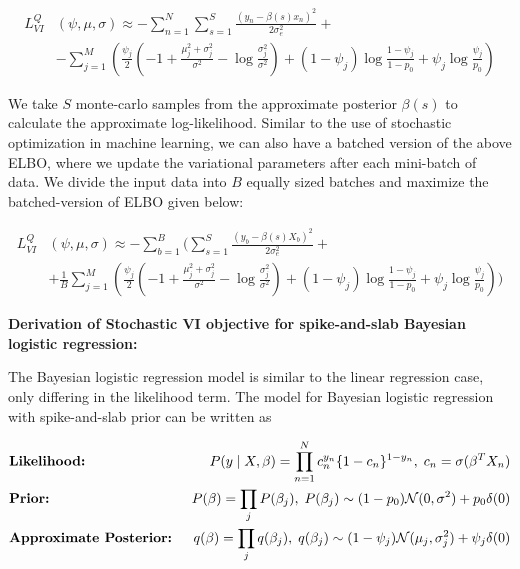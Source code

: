 \begin{align}
    L^{Q}_{VI}&(\psi, \mu, \sigma) \approx - \sum\limits^{N}_{n=1} \sum\limits^{S}_{s=1} \frac{(y_n - \beta(s) x_n)^2}{2 \sigma_e^2} + \nonumber \\
    &- \sum\limits^{M}_{j=1} \left(  \frac{\psi_j}{2}\left(-1 + \frac{\mu_j^2 + \sigma_j^2}{\sigma^2} - \log \frac{\sigma_j^2}{\sigma^2} \right) + (1-\psi_j)\log\frac{1 - \psi_j}{1 - p_0} + \psi_j\log\frac{\psi_j}{p_0} \right )
\end{align}

%
We take $S$ monte-carlo samples from the approximate posterior $\beta(s)$ to calculate the approximate log-likelihood.
%
Similar to the use of stochastic optimization in machine learning, we can also have a batched version of the above ELBO, where we update the variational parameters after each mini-batch of data.
%
We divide the input data into $B$ equally sized batches and maximize the batched-version of ELBO given below:

\begin{align}
    L^{Q}_{VI}&(\psi, \mu, \sigma) \approx - \sum\limits^{B}_{b=1} \Bigg( \sum\limits^{S}_{s=1} \frac{(y_b - \beta(s) X_b)^2}{2 \sigma_e^2} + \nonumber \\
    &+ \frac{1}{B}\sum\limits^{M}_{j=1} \left(  \frac{\psi_j}{2}\left(-1 + \frac{\mu_j^2 + \sigma_j^2}{\sigma^2} - \log \frac{\sigma_j^2}{\sigma^2} \right) + (1-\psi_j)\log\frac{1 - \psi_j}{1 - p_0} + \psi_j\log\frac{\psi_j}{p_0} \right) \Bigg)
    \label{elbo-loss}
\end{align}


%
\vspace{3mm}
\noindent \textbf{Derivation of Stochastic VI objective for spike-and-slab Bayesian logistic regression:}
\vspace{2mm}
%

%
The Bayesian logistic regression model is similar to the linear regression case, only differing in the likelihood term.
%
The model for Bayesian logistic regression with spike-and-slab prior can be written as
%

\begin{align}
    &\text{\textbf{Likelihood:} } &P(y \mid X, \beta) = \prod_{n=1}^{N} c_n^{y_n} \{1 - c_n\}^{1-y_n}, \hspace{1mm} c_n = \sigma(\beta^T X_n) \nonumber \\
    &\text{\textbf{Prior:} } &P(\beta) = \prod_j P(\beta_j), \hspace{1mm} P(\beta_j) \sim (1-p_0)\mathcal{N} (0, \sigma ^ 2) + p_0 \delta(0) \nonumber \\
    &\text{\textbf{Approximate Posterior:} } &q(\beta) = \prod_j q(\beta_j), \hspace{1mm} q(\beta_j) \sim (1-\psi_j)\mathcal{N}(\mu_j, \sigma^2_j) + \psi_j \delta(0)
    \label{spike-and-slab-model3}
\end{align}

